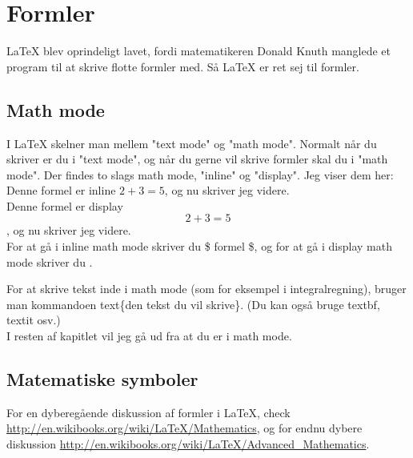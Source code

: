 \chapter{Formler}
\label{chap:formler}
LaTeX blev oprindeligt lavet, fordi matematikeren Donald Knuth manglede et program til at skrive flotte formler med. Så LaTeX er ret sej til formler.

\section{Math mode}
I LaTeX skelner man mellem "text mode" og "math mode". Normalt når du skriver er du i "text mode", og når du gerne vil skrive formler skal du i "math mode". Der findes to slags math mode, "inline" og "display". Jeg viser dem her:\\

\indent Denne formel er inline $2 + 3 = 5$, og nu skriver jeg videre.\\
\indent Denne formel er display \[2 + 3 = 5\]\indent, og nu skriver jeg videre.\\

\noindent For at gå i inline math mode skriver du \$ formel \$, og for at gå i display math mode skriver du \bs [ formel \bs ].

For at skrive tekst inde i math mode (som for eksempel i integralregning), bruger man kommandoen \bs text\{den tekst du vil skrive\}. (Du kan også bruge \bs textbf, \bs textit osv.)\\

\noindent
I resten af kapitlet vil jeg gå ud fra at du er i math mode.

\section{Matematiske symboler}


For en dyberegående diskussion af formler i LaTeX, check \url{http://en.wikibooks.org/wiki/LaTeX/Mathematics}, og for endnu dybere diskussion \url{http://en.wikibooks.org/wiki/LaTeX/Advanced_Mathematics}.